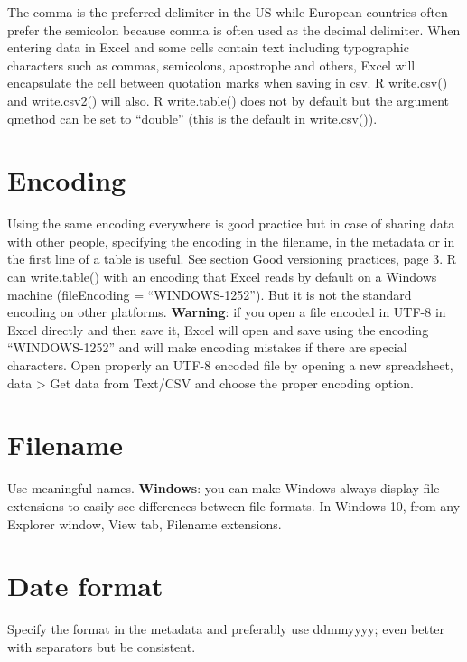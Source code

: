 \documentclass[
]{book}
\begin{document}
The comma is the preferred delimiter in the US while European countries often prefer the semicolon because comma is often used as the decimal delimiter. When entering data in Excel and some cells contain text including typographic characters such as commas, semicolons, apostrophe and others, Excel will encapsulate the cell between quotation marks when saving in csv. R write.csv() and write.csv2() will also. R write.table() does not by default but the argument qmethod can be set to ``double'' (this is the default in write.csv()).

\hypertarget{encoding}{%
\section{Encoding}\label{encoding}}

Using the same encoding everywhere is good practice but in case of sharing data with other people, specifying the encoding in the filename, in the metadata or in the first line of a table is useful. See section Good versioning practices, page 3.
R can write.table() with an encoding that Excel reads by default on a Windows machine (fileEncoding = ``WINDOWS-1252''). But it is not the standard encoding on other platforms.
\textbf{Warning}: if you open a file encoded in UTF-8 in Excel directly and then save it, Excel will open and save using the encoding ``WINDOWS-1252'' and will make encoding mistakes if there are special characters. Open properly an UTF-8 encoded file by opening a new spreadsheet, data \textgreater{} Get data from Text/CSV and choose the proper encoding option.

\hypertarget{filename}{%
\section{Filename}\label{filename}}

Use meaningful names.
\textbf{Windows}: you can make Windows always display file extensions to easily see differences between file formats. In Windows 10, from any Explorer window, View tab, Filename extensions.

\hypertarget{date-format}{%
\section{Date format}\label{date-format}}

Specify the format in the metadata and preferably use ddmmyyyy; even better with separators but be consistent.
\end{document}
